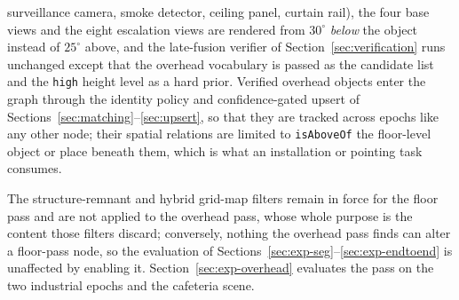 \begin{enumerate}[leftmargin=2.2em,itemsep=2pt]
        surveillance camera, smoke detector, ceiling panel, curtain rail),
        the four base views and the eight escalation views are rendered from
        $30^\circ$ \emph{below} the object instead of $25^\circ$ above, and
        the late-fusion verifier of Section~\ref{sec:verification} runs
        unchanged except that the overhead vocabulary is passed as the
        candidate list and the \texttt{high} height level as a hard prior.
        Verified overhead objects enter the graph through the identity
        policy and confidence-gated upsert of
        Sections~\ref{sec:matching}--\ref{sec:upsert}, so that they are
        tracked across epochs like any other node; their spatial relations
        are limited to \texttt{isAboveOf} the floor-level object or place
        beneath them, which is what an installation or pointing task
        consumes.
\end{enumerate}
The structure-remnant and hybrid grid-map filters remain in force for the
floor pass and are not applied to the overhead pass, whose whole purpose is
the content those filters discard; conversely, nothing the overhead pass
finds can alter a floor-pass node, so the evaluation of
Sections~\ref{sec:exp-seg}--\ref{sec:exp-endtoend} is unaffected by enabling
it. Section~\ref{sec:exp-overhead} evaluates the pass on the two industrial
epochs and the cafeteria scene.
